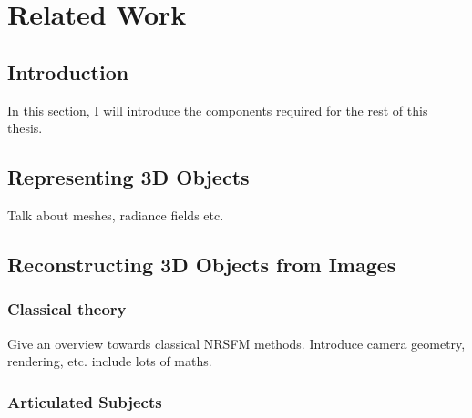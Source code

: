 
\chapter{Related Work}

\ifpdf
    \graphicspath{{Chapter2/Figs/Raster/}{Chapter2/Figs/PDF/}{Chapter2/Figs/}}
\else
    \graphicspath{{Chapter2/Figs/Vector/}{Chapter2/Figs/}}
\fi



\section{Introduction}

In this section, I will introduce the components required for the rest of this thesis.

\section{Representing 3D Objects}

Talk about meshes, radiance fields etc.

\section{Reconstructing 3D Objects from Images}

\subsection{Classical theory}

Give an overview towards classical NRSFM methods. Introduce camera geometry, rendering, etc. include lots of maths.

\subsection{Articulated Subjects}

